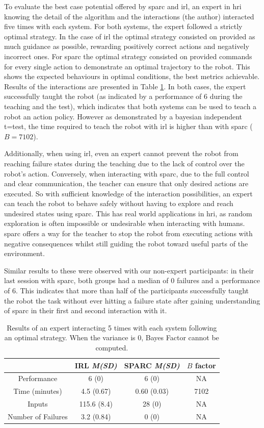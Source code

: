 To evaluate the best case potential offered by \gls{sparc} and \gls{irl}, an expert in \gls{hri} knowing the detail of the algorithm and the interactions (the author) interacted five times with each system. For both systems, the expert followed a strictly optimal strategy. In the case of \gls{irl} the optimal strategy consisted on provided as much guidance as possible, rewarding positively correct actions and negatively incorrect ones. For \gls{sparc} the optimal strategy consisted on provided commands for every single action to demonstrate an optimal trajectory to the robot. This shows the expected behaviours in optimal conditions, the best metrics achievable. Results of the interactions are presented in Table \ref{tab:control_expert}. In both cases, the expert successfully taught the robot (as indicated by a performance of 6 during the teaching and the test), which indicates that both systems can be used to teach a robot an action policy. However as demonstrated by a bayesian independent t=test, the time required to teach the robot with \gls{irl} is higher than with \gls{sparc} ($B=7102$). 

Additionally, when using \gls{irl}, even an expert cannot prevent the robot from reaching failure states during the teaching due to the lack of control over the robot's action. Conversely, when interacting with \gls{sparc}, due to the full control and clear communication, the teacher can ensure that only desired actions are executed. So with sufficient knowledge of the interaction possibilities, an expert can teach the robot to behave safely without having to explore and reach undesired states using \gls{sparc}. This has real world applications in \gls{hri}, as random exploration is often impossible or undesirable when interacting with humans. \gls{sparc} offers a way for the teacher to stop the robot from executing actions with negative consequences whilst still guiding the robot toward useful parts of the environment.

Similar results to these were observed with our non-expert participants: in their last session with \gls{sparc}, both groups had a median of 0 failures and a performance of 6. This indicates that more than half of the participants successfully taught the robot the task without ever hitting a failure state after gaining understanding of \gls{sparc} in their first and second interaction with it.

\begin{table}[ht]
	\centering
	\caption{Results of an expert interacting 5 times with each system following an optimal strategy. When the variance is 0, Bayes Factor cannot be computed.}
	\label{tab:control_expert}
	\begin{tabular}{cccc}
	&IRL \textit{M(SD)} & SPARC \textit{M(SD)} & $B$ factor\\
		\midrule
		Performance & 6 (0) & 6 (0) & NA \\
		Time (minutes) & 4.5 (0.67) & 0.60 (0.03) & 7102 \\
		Inputs & 115.6 (8.4) & 28 (0) & NA \\
		Number of Failures & 3.2 (0.84) & 0 (0) & NA \\
	\end{tabular}
\end{table}

